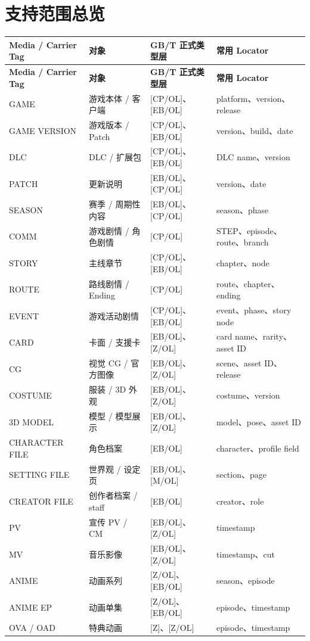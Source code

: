\documentclass[profile=editorial,titlelayout=\AtelierSpecimenTitleLayout]{atelier}
\newcommand{\MiniTableHead}{%
\textbf{Media / Carrier Tag} & \textbf{对象} & \textbf{GB/T 正式类型层} & \textbf{常用 Locator}}
\begin{document}
\section{支持范围总览}
\small
\begin{longtable}{@{}p{31mm}p{37mm}p{42mm}p{45mm}@{}}
\toprule
\MiniTableHead\\
\midrule
\endfirsthead
\toprule
\MiniTableHead\\
\midrule
\endhead
GAME & 游戏本体 / 客户端 & [CP/OL]、[EB/OL] & platform、version、release \\
GAME VERSION & 游戏版本 / Patch & [CP/OL]、[EB/OL] & version、build、date \\
DLC & DLC / 扩展包 & [CP/OL]、[EB/OL] & DLC name、version \\
PATCH & 更新说明 & [EB/OL]、[CP/OL] & version、date \\
SEASON & 赛季 / 周期性内容 & [EB/OL]、[CP/OL] & season、phase \\
COMM & 游戏剧情 / 角色剧情 & [CP/OL] & STEP、episode、route、branch \\
STORY & 主线章节 & [CP/OL]、[EB/OL] & chapter、node \\
ROUTE & 路线剧情 / Ending & [CP/OL] & route、chapter、ending \\
EVENT & 游戏活动剧情 & [CP/OL]、[EB/OL] & event、phase、story node \\
CARD & 卡面 / 支援卡 & [EB/OL]、[Z/OL] & card name、rarity、asset ID \\
CG & 视觉 CG / 官方图像 & [EB/OL]、[Z/OL] & scene、asset ID、release \\
COSTUME & 服装 / 3D 外观 & [EB/OL]、[Z/OL] & costume、version \\
3D MODEL & 模型 / 模型展示 & [EB/OL]、[Z/OL] & model、pose、asset ID \\
CHARACTER FILE & 角色档案 & [EB/OL] & character、profile field \\
SETTING FILE & 世界观 / 设定页 & [EB/OL]、[M/OL] & section、page \\
CREATOR FILE & 创作者档案 / staff & [EB/OL] & creator、role \\
PV & 宣传 PV / CM & [EB/OL]、[Z/OL] & timestamp \\
MV & 音乐影像 & [EB/OL]、[Z/OL] & timestamp、cut \\
ANIME & 动画系列 & [Z/OL]、[EB/OL] & season、episode \\
ANIME EP & 动画单集 & [Z/OL]、[EB/OL] & episode、timestamp \\
OVA / OAD & 特典动画 & [Z]、[Z/OL] & episode、timestamp \\

\end{longtable}
\end{document}
